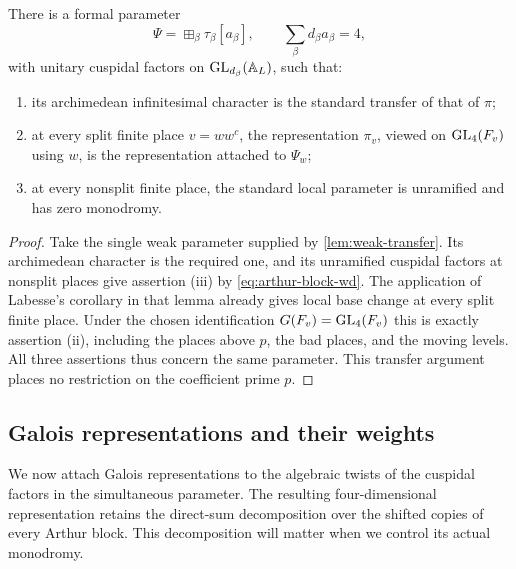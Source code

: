 \begin{proposition}
\label{prop:simultaneous-transfer}
There is a formal parameter
\[
 \Psi=\boxplus_\beta\tau_\beta[a_\beta],
 \qquad \sum_\beta d_\beta a_\beta=4,
\]
with unitary cuspidal factors on $\operatorname{GL}_{d_\beta}(\mathbb A_L)$, such that:
\begin{enumerate}[label=\textup{(\roman*)}]
 \item its archimedean infinitesimal character is the standard transfer
 of that of $\pi$;
 \item at every split finite place $v=ww^c$, the representation
 $\pi_v$, viewed on $\operatorname{GL}_4(F_v)$ using $w$, is the representation
 attached to $\Psi_w$;
 \item at every nonsplit finite place, the standard local parameter
 is unramified and has zero monodromy.
\end{enumerate}
\end{proposition}

\begin{proof}
Take the single weak parameter supplied by \cref{lem:weak-transfer}.
Its archimedean character is the required one, and its unramified
cuspidal factors at nonsplit places give assertion \textup{(iii)}
by \cref{eq:arthur-block-wd}.
The application of Labesse's corollary in that lemma already gives
local base change at every split finite place.  Under the chosen
identification $G(F_v)=\operatorname{GL}_4(F_v)$ this is exactly assertion
\textup{(ii)}, including the places above $p$, the bad places, and
the moving levels.  All three assertions thus concern the same
parameter.  This transfer argument places no restriction on the
coefficient prime $p$.
\end{proof}

\subsection{Galois representations and their weights}

We now attach Galois representations to the algebraic twists of the
cuspidal factors in the simultaneous parameter.  The resulting
four-dimensional representation retains the direct-sum decomposition
over the shifted copies of every Arthur block.  This decomposition
will matter when we control its actual monodromy.

